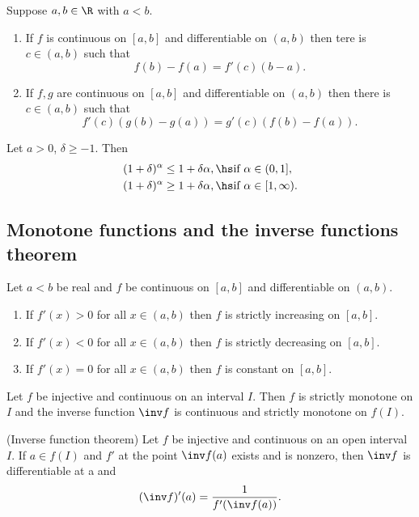 \documentclass{article}
\begin{document}
\begin{theorem}
	Suppose $a,b\in\R$ with $a<b$.
	\begin{enumerate}
		\item If $f$ is continuous on $[a,b]$ and differentiable on $(a,b)$
		      then tere is $c\in(a,b)$ such that \[f(b)-f(a)=f'(c)(b-a).\]
		\item If $f,g$ are continuous on $[a,b]$ and differentiable on $(a,b)$
		      then there is $c\in(a,b)$ such that
		      \[f'(c)(g(b)-g(a))=g'(c)(f(b)-f(a)).\]
	\end{enumerate}
\end{theorem}

\begin{lemma*}
	Let $a>0$, $\delta \geq -1$. Then
	\begin{align*}
		(1+\delta)^\alpha & \leq 1+\delta\alpha,\hs\text{if }\alpha\in(0,1],      \\
		(1+\delta)^\alpha & \geq 1+\delta\alpha,\hs\text{if }\alpha\in[1,\infty).
	\end{align*}
\end{lemma*}

\subsection{Monotone functions and the inverse functions theorem}

\setcounter{theorem}{1}
\begin{theorem}[Ross, 29.7]
	Let $a<b$ be real and $f$ be continuous on $[a,b]$ and differentiable
	on $(a,b)$.
	\begin{enumerate}[label=(\arabic*)]
		\item If $f'(x)>0$ for all $x\in(a,b)$ then $f$ is strictly increasing on $[a,b]$.
		\item If $f'(x)<0$ for all $x\in(a,b)$ then $f$ is strictly decreasing on $[a,b]$.
		\item If $f'(x)=0$ for all $x\in(a,b)$ then $f$ is constant on $[a,b]$.
	\end{enumerate}
\end{theorem}

\begin{theorem}
	Let $f$ be injective and continuous on an interval $I$. Then $f$ is strictly
	monotone on $I$ and the inverse function $\inv f$ is continuous and
	strictly monotone on $f(I)$.
\end{theorem}

\setcounter{theorem}{4}
\begin{theorem}(Inverse function theorem)
	Let $f$ be injective and continuous on an open interval $I$.
	If $a\in f(I)$ and $f'$ at the point $\inv f(a)$ exists and is
	nonzero, then $\inv f$ is differentiable at a and
	\begin{align*}
		(\inv f)'(a) = \frac{1}{f'(\inv f(a))}.
	\end{align*}
\end{theorem}
\end{document}
